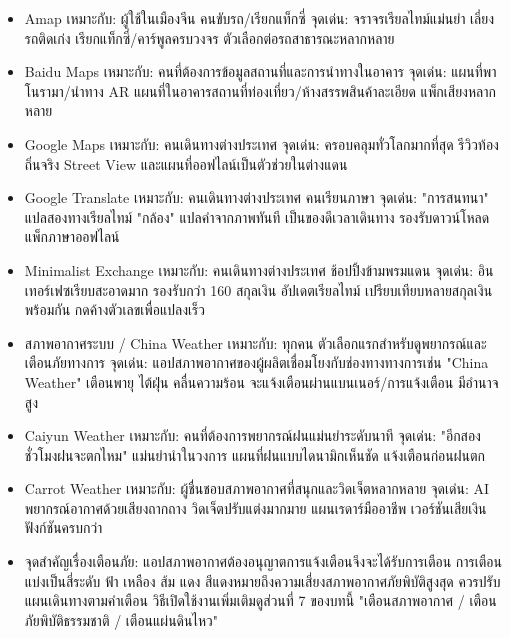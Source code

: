 
\begin{itemize}
  \item Amap เหมาะกับ: ผู้ใช้ในเมืองจีน คนขับรถ/เรียกแท็กซี่ จุดเด่น: จราจรเรียลไทม์แม่นยำ เลี่ยงรถติดเก่ง เรียกแท็กซี่/คาร์พูลครบวงจร ตัวเลือกต่อรถสาธารณะหลากหลาย
  \item Baidu Maps เหมาะกับ: คนที่ต้องการข้อมูลสถานที่และการนำทางในอาคาร จุดเด่น: แผนที่พาโนรามา/นำทาง AR แผนที่ในอาคารสถานที่ท่องเที่ยว/ห้างสรรพสินค้าละเอียด แพ็กเสียงหลากหลาย
  \item Google Maps เหมาะกับ: คนเดินทางต่างประเทศ จุดเด่น: ครอบคลุมทั่วโลกมากที่สุด รีวิวท้องถิ่นจริง Street View และแผนที่ออฟไลน์เป็นตัวช่วยในต่างแดน
\end{itemize}


\begin{itemize}
  \item Google Translate เหมาะกับ: คนเดินทางต่างประเทศ คนเรียนภาษา จุดเด่น: "การสนทนา" แปลสองทางเรียลไทม์ "กล้อง" แปลคำจากภาพทันที เป็นของดีเวลาเดินทาง รองรับดาวน์โหลดแพ็กภาษาออฟไลน์
\end{itemize}


\begin{itemize}
  \item Minimalist Exchange เหมาะกับ: คนเดินทางต่างประเทศ ช้อปปิ้งข้ามพรมแดน จุดเด่น: อินเทอร์เฟซเรียบสะอาดมาก รองรับกว่า 160 สกุลเงิน อัปเดตเรียลไทม์ เปรียบเทียบหลายสกุลเงินพร้อมกัน กดค้างตัวเลขเพื่อแปลงเร็ว
\end{itemize}


\begin{itemize}
  \item สภาพอากาศระบบ / China Weather เหมาะกับ: ทุกคน ตัวเลือกแรกสำหรับดูพยากรณ์และเตือนภัยทางการ จุดเด่น: แอปสภาพอากาศของผู้ผลิตเชื่อมโยงกับช่องทางทางการเช่น "China Weather" เตือนพายุ ไต้ฝุ่น คลื่นความร้อน จะแจ้งเตือนผ่านแบนเนอร์/การแจ้งเตือน มีอำนาจสูง
  \item Caiyun Weather เหมาะกับ: คนที่ต้องการพยากรณ์ฝนแม่นยำระดับนาที จุดเด่น: "อีกสองชั่วโมงฝนจะตกไหม" แม่นยำนำในวงการ แผนที่ฝนแบบไดนามิกเห็นชัด แจ้งเตือนก่อนฝนตก
  \item Carrot Weather เหมาะกับ: ผู้ชื่นชอบสภาพอากาศที่สนุกและวิดเจ็ตหลากหลาย จุดเด่น: AI พยากรณ์อากาศด้วยเสียงถากถาง วิดเจ็ตปรับแต่งมากมาย แผนเรดาร์มืออาชีพ เวอร์ชันเสียเงินฟังก์ชันครบกว่า
  \item จุดสำคัญเรื่องเตือนภัย: แอปสภาพอากาศต้องอนุญาตการแจ้งเตือนจึงจะได้รับการเตือน การเตือนแบ่งเป็นสี่ระดับ ฟ้า เหลือง ส้ม แดง สีแดงหมายถึงความเสี่ยงสภาพอากาศภัยพิบัติสูงสุด ควรปรับแผนเดินทางตามคำเตือน วิธีเปิดใช้งานเพิ่มเติมดูส่วนที่ 7 ของบทนี้ "เตือนสภาพอากาศ / เตือนภัยพิบัติธรรมชาติ / เตือนแผ่นดินไหว"
\end{itemize}

